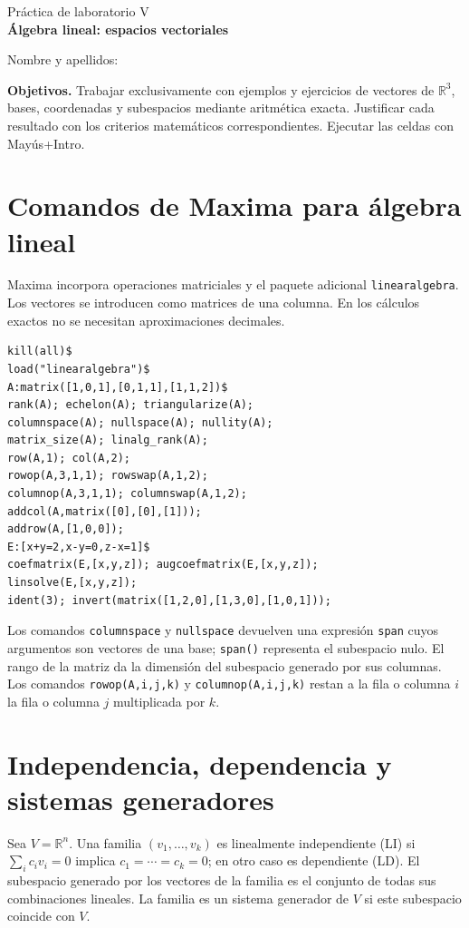 \documentclass[12pt,a4paper]{article}
\begin{document}
\begin{center}{\large Práctica de laboratorio V}\\[5pt]{\LARGE\bfseries\color{azul} Álgebra lineal: espacios vectoriales}\end{center}
\noindent Nombre y apellidos: \hrulefill\par\medskip
\noindent\textbf{Objetivos.} Trabajar exclusivamente con ejemplos y ejercicios de vectores de $\mathbb R^3$, bases, coordenadas y subespacios mediante aritmética exacta. Justificar cada resultado con los criterios matemáticos correspondientes. Ejecutar las celdas con Mayús+Intro.
\section{Comandos de Maxima para álgebra lineal}
Maxima incorpora operaciones matriciales y el paquete adicional \texttt{linearalgebra}. Los vectores se introducen como matrices de una columna. En los cálculos exactos no se necesitan aproximaciones decimales.
\begin{lstlisting}
kill(all)$
load("linearalgebra")$
A:matrix([1,0,1],[0,1,1],[1,1,2])$
rank(A); echelon(A); triangularize(A);
columnspace(A); nullspace(A); nullity(A);
matrix_size(A); linalg_rank(A);
row(A,1); col(A,2);
rowop(A,3,1,1); rowswap(A,1,2);
columnop(A,3,1,1); columnswap(A,1,2);
addcol(A,matrix([0],[0],[1]));
addrow(A,[1,0,0]);
E:[x+y=2,x-y=0,z-x=1]$
coefmatrix(E,[x,y,z]); augcoefmatrix(E,[x,y,z]);
linsolve(E,[x,y,z]);
ident(3); invert(matrix([1,2,0],[1,3,0],[1,0,1]));
\end{lstlisting}
\noindent Los comandos \texttt{columnspace} y \texttt{nullspace} devuelven una expresión \texttt{span} cuyos argumentos son vectores de una base; \texttt{span()} representa el subespacio nulo. El rango de la matriz da la dimensión del subespacio generado por sus columnas. Los comandos \texttt{rowop(A,i,j,k)} y \texttt{columnop(A,i,j,k)} restan a la fila o columna $i$ la fila o columna $j$ multiplicada por $k$.
\section{Independencia, dependencia y sistemas generadores}
Sea $V=\mathbb R^n$. Una familia $(v_1,\ldots,v_k)$ es linealmente independiente (LI) si $\sum_i c_i v_i=0$ implica $c_1=\cdots=c_k=0$; en otro caso es dependiente (LD). El subespacio generado por los vectores de la familia es el conjunto de todas sus combinaciones lineales. La familia es un sistema generador de $V$ si este subespacio coincide con $V$.
\end{document}
